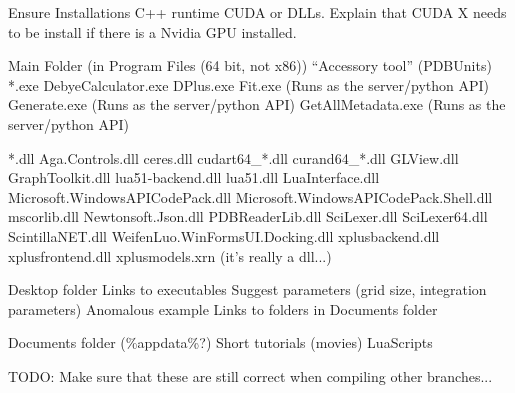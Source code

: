\documentclass[10pt,a4paper]{article}
\begin{document}
	
	\begin{outline}
	\1 Ensure Installations
	\2 C++ runtime
	\2 CUDA or DLLs. Explain that CUDA X needs to be install if there is a Nvidia GPU installed.
	
	\1 Main Folder (in Program Files (64 bit, not x86))
		\2 ``Accessory tool'' (PDBUnits)
		\2 *.exe
			\3 DebyeCalculator.exe
			\3 DPlus.exe
			\3 Fit.exe (Runs as the server/python API)
			\3 Generate.exe (Runs as the server/python API)
			\3 GetAllMetadata.exe (Runs as the server/python API)	
		
		\2 *.dll
			\3 Aga.Controls.dll
			\3 ceres.dll
			\3 cudart64\_*.dll
			\3 curand64\_*.dll
			\3 GLView.dll
			\3 GraphToolkit.dll
			\3 lua51-backend.dll
			\3 lua51.dll
			\3 LuaInterface.dll
			\3 Microsoft.WindowsAPICodePack.dll
			\3 Microsoft.WindowsAPICodePack.Shell.dll
			\3 mscorlib.dll
			\3 Newtonsoft.Json.dll
			\3 PDBReaderLib.dll
			\3 SciLexer.dll
			\3 SciLexer64.dll
			\3 ScintillaNET.dll
			\3 WeifenLuo.WinFormsUI.Docking.dll
			\3 xplusbackend.dll
			\3 xplusfrontend.dll
			\3 xplusmodels.xrn (it's really a dll...)
	
	\1 Desktop folder
		\2 Links to executables
		\2 Suggest parameters (grid size, integration parameters)
		\2 Anomalous example
		\2 Links to folders in Documents folder
	
	\1 Documents folder  (\%appdata\%?)
		\2 Short tutorials (movies)
		\2 LuaScripts
	
	\end{outline}
	
	TODO: Make sure that these are still correct when compiling other branches...
	
	
\end{document}
